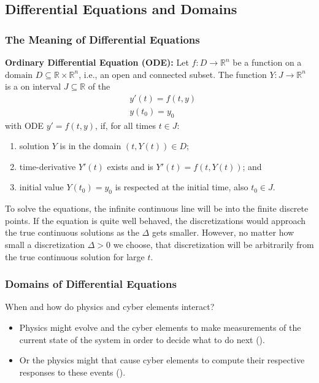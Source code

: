 \subsection{Differential Equations and Domains}

\subsubsection{The Meaning of Differential Equations}

\textbf{Ordinary Differential Equation (ODE):} 
Let $f: D \to \mathds{R}^n$ be a function on a 
$\text{domain } D \subseteq \mathds{R} \times \mathds{R}^n$,
i.e., an open and connected subset.
The function $Y: J \to \mathds{R}^n$ is a  on 
interval $J \subseteq \mathds{R}$ of the 
  \begin{align*}
    &y'(t) = f(t, y) \\
    &y(t_0) = y_0
  \end{align*}
  with ODE $y' = f(t, y)$, 
if, for all times $t \in J$: 
\vspace{-.5cm}
\begin{enumerate}
  \item solution $Y$ is in the domain $(t, Y(t)) \in D$; 
  \item time-derivative $Y'(t)$ exists and is $Y'(t) = f(t, Y(t))$; and
  \item initial value $Y(t_0)=y_0$ is respected at the initial time, also
    $t_0 \in J$.
\end{enumerate}

To solve the equations, the infinite continuous line will be 
 into the finite discrete points.
If the equation is quite well behaved,
the discretizations would approach the true continuous solutions as the 
$\Delta$ gets smaller.
However, no matter how small a discretization $\Delta > 0$ we choose,
that discretization will be arbitrarily  
from the true continuous solution for large $t$.

\subsubsection{Domains of Differential Equations}

When and how do physics and cyber elements interact?
\vspace{-.5cm}
\begin{itemize}
  \item Physics might evolve and the cyber elements 
     to make measurements of 
    the current state of the system in order to decide what to do next 
    ().
  \item Or the physics might  
    that cause cyber elements to compute their respective responses to 
    these events ().
\end{itemize}

